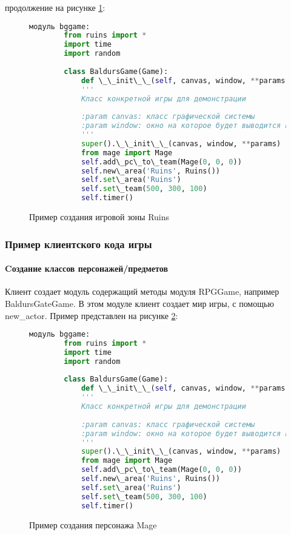 продолжение на рисунке \ref{ruins2:image}:
\begin{figure}[H]
	\begin{lstlisting}[language=Python]		
		модуль bggame:
		from ruins import *
		import time
		import random
		
		class BaldursGame(Game):
			def \_\_init\_\_(self, canvas, window, **params):
			'''
			Класс конкретной игры для демонстрации
		
			:param canvas: класс графической системы
			:param window: окно на которое будет выводится игра
			'''
			super().\_\_init\_\_(canvas, window, **params)
			from mage import Mage
			self.add\_pc\_to\_team(Mage(0, 0, 0))
			self.new\_area('Ruins', Ruins())
			self.set\_area('Ruins')
			self.set\_team(500, 300, 100)
			self.timer()
	\end{lstlisting}  
	\caption{Пример создания игровой зоны Ruins}
	\label{ruins2:image}
\end{figure}


\subsubsection{Пример клиентского кода игры}
\paragraph{Cоздание классов персонажей/предметов}
Клиент создает модуль содержащий методы модуля RPGGame, например BaldursGateGame. В этом модуле клиент создает мир игры, с помощью new\_actor.
Пример представлен на рисунке \ref{answer:image}:
\begin{figure}[H]
	\begin{lstlisting}[language=Python]
		модуль bggame:
		from ruins import *
		import time
		import random
		
		class BaldursGame(Game):
			def \_\_init\_\_(self, canvas, window, **params):
			'''
			Класс конкретной игры для демонстрации
		
			:param canvas: класс графической системы
			:param window: окно на которое будет выводится игра
			'''
			super().\_\_init\_\_(canvas, window, **params)
			from mage import Mage
			self.add\_pc\_to\_team(Mage(0, 0, 0))
			self.new\_area('Ruins', Ruins())
			self.set\_area('Ruins')
			self.set\_team(500, 300, 100)
			self.timer()
	\end{lstlisting}  
\caption{Пример создания персонажа Mage}
\label{answer:image}
\end{figure}


